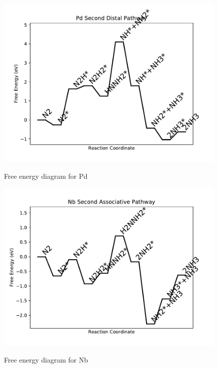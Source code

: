 \documentclass[journal=jacsat,manuscript=article]{achemso}
\begin{document}
\begin{figure}
\includegraphics[width=1\linewidth]{data/plots/Pd_distal_2.pdf}
\label{fig:Pd_distal_2}
\caption{Free energy diagram for Pd}
\end{figure}

\newpage
\begin{figure}
\includegraphics[width=1\linewidth]{data/plots/Nb_associative_2.pdf}
\label{fig:Nb_associative_2}
\caption{Free energy diagram for Nb}
\end{figure}
\end{document}
